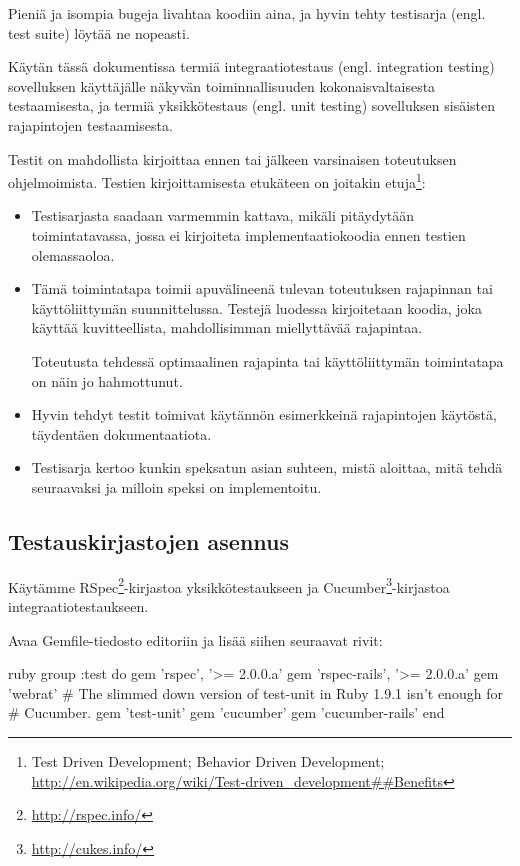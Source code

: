 \documentclass{article}
\newcommand{\pdfforeignlanguage}[2]{\texorpdfstring{\foreignlanguage{#1}{#2}}{#2}}
\newcommand{\eng}[1]{\pdfforeignlanguage{english}{#1}}
\begin{document}
Pieniä ja isompia bugeja livahtaa koodiin aina, ja hyvin tehty testisarja
(engl. \eng{test suite}) löytää ne nopeasti.

Käytän tässä dokumentissa termiä integraatiotestaus (engl. \eng{integration
testing}) sovelluksen käyttäjälle näkyvän toiminnallisuuden kokonaisvaltaisesta
testaamisesta, ja termiä yksikkötestaus (engl. \eng{unit testing}) sovelluksen
sisäisten rajapintojen testaamisesta.

Testit on mahdollista kirjoittaa ennen tai jälkeen varsinaisen toteutuksen
ohjelmoimista. Testien kirjoittamisesta etukäteen on joitakin
etuja\footnote{\eng{Test Driven Development; Behavior Driven Development;
\url{http://en.wikipedia.org/wiki/Test-driven\_development##Benefits}}}:

\begin{itemize}
\item
Testisarjasta saadaan varmemmin kattava, mikäli pitäydytään toimintatavassa,
jossa ei kirjoiteta implementaatiokoodia ennen testien olemassaoloa.

\item
Tämä toimintatapa toimii apuvälineenä tulevan toteutuksen rajapinnan tai
käyttöliittymän suunnittelussa. Testejä luodessa kirjoitetaan koodia, joka
käyttää kuvitteellista, mahdollisimman miellyttävää rajapintaa.

Toteutusta tehdessä optimaalinen rajapinta tai käyttöliittymän toimintatapa on
näin jo hahmottunut.

\item
Hyvin tehdyt testit toimivat käytännön esimerkkeinä rajapintojen käytöstä,
täydentäen dokumentaatiota.

\item
Testisarja kertoo kunkin speksatun asian suhteen, mistä aloittaa, mitä tehdä
seuraavaksi ja milloin speksi on implementoitu.
\end{itemize}

\subsection{Testauskirjastojen asennus}

Käytämme RSpec\footnote{\url{http://rspec.info/}}-kirjastoa yksikkötestaukseen
ja Cucumber\footnote{\url{http://cukes.info/}}-kirjastoa
integraatiotestaukseen.

\begin{samepage}
Avaa Gemfile-tiedosto editoriin ja lisää siihen seuraavat rivit:

\begin{pygmented}{ruby}
group :test do
  gem 'rspec', '>= 2.0.0.a'
  gem 'rspec-rails', '>= 2.0.0.a'
  gem 'webrat'
  # The slimmed down version of test-unit in Ruby 1.9.1 isn't enough for
  # Cucumber.
  gem 'test-unit'
  gem 'cucumber'
  gem 'cucumber-rails'
end
\end{pygmented}
\end{samepage}
\end{document}
